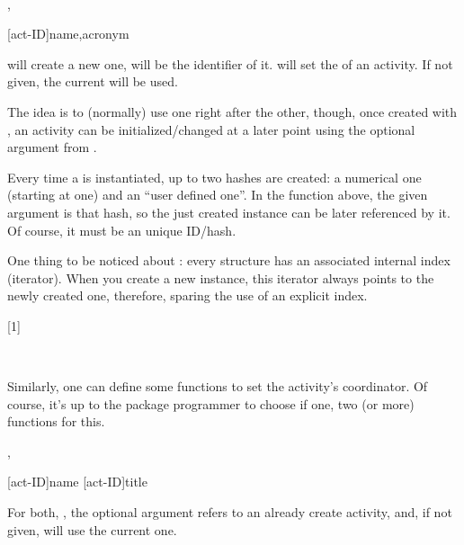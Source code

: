 \documentclass[10pt]{article}
\begin{document}
~

\begin{codedescribe}{\NewActivity,\ActivitySet}
\begin{codesyntax}
  \tsmacro{\ActivitySet}[act-ID]{name,acronym}
\end{codesyntax}
\tsobj{\NewActivity} will create a new one,  will be the identifier of it. \tsobj{\ActivitySet} will set the  of an activity. If not given, the current  will be used.

The idea is to (normally) use one right after the other, though, once created with \tsobj{\NewActivity}, an activity can be initialized/changed at a later point using the optional argument from \tsobj{\ActivitySet}.

\end{codedescribe}
\begin{tsremark}
  Every time a  is instantiated, up to two hashes are created: a numerical one (starting at one) and an ``user defined one''. In the \tsobj{\NewActivity} function above, the given argument is that hash, so the just created instance can be later referenced by it. Of course, it must be an unique ID/hash.
\end{tsremark}
\begin{tsremark}
  One thing to be noticed about : every structure has an associated internal index (iterator). When you create a new instance, this iterator always points to the newly created one, therefore, sparing the use of an explicit index.
\end{tsremark}

[1]

~

Similarly, one can define some functions to set the activity's coordinator. Of course, it's up to the package programmer to choose if one, two (or more) functions for this.

\begin{codedescribe}{\ActivitySetCoord,\ActivitySetCoordTitle}
\begin{codesyntax}
  \tsmacro{\ActivitySetCoord}[act-ID]{name}
  \tsmacro{\ActivitySetCoordTitle}[act-ID]{title}
\end{codesyntax}
For both, \tsobj{\ActivitySetCoord,\ActivitySetCoordTitle}, the optional argument  refers to an already create activity, and, if not given, will use the current one.
\end{codedescribe}
\end{document}
